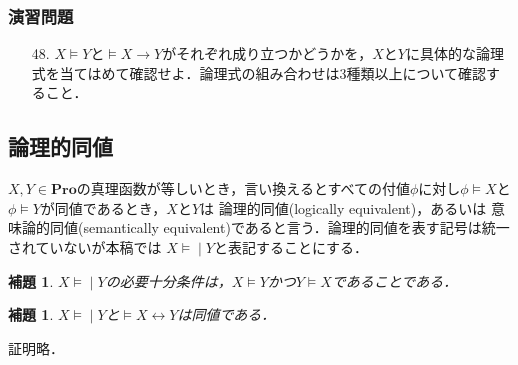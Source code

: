 \documentclass{ltjsarticle}
\theoremstyle{mystyle1}
\newtheorem{lem}[dfn]{補題}
\theoremstyle{mystyle2}
\newcommand{\bPro}{\ensuremath{\mathbf{Pro}}}
\newcommand{\lequiv}{\ensuremath{\models\!\mid}}
\newcommand{\red}[1]{{\color{red} #1}}
\begin{document}
\subsubsection*{演習問題}
\begin{enumerate}
  \item[48.] $X\models Y$と$\models X\to Y$がそれぞれ成り立つかどうかを，$X$と$Y$に具体的な論理式を当てはめて確認せよ．論理式の組み合わせは3種類以上について確認すること．
\end{enumerate}
\subsection{論理的同値}
$X,Y\in\bPro$の真理函数が等しいとき，言い換えるとすべての付値$\phi$に対し$\phi\models X$と$\phi\models Y$が同値であるとき，$X$と$Y$は\red{論理的同値}(logically equivalent)，あるいは\red{意味論的同値}(semantically equivalent)であると言う．論理的同値を表す記号は統一されていないが本稿では\red{$X\lequiv Y$}と表記することにする．
\begin{lem}
  $X\lequiv Y$の必要十分条件は，$X\models Y$かつ$Y\models X$であることである．
\end{lem}
\begin{lem}
  $X\lequiv Y$と$\models X\leftrightarrow Y$は同値である．
\end{lem}
証明略．
\end{document}

